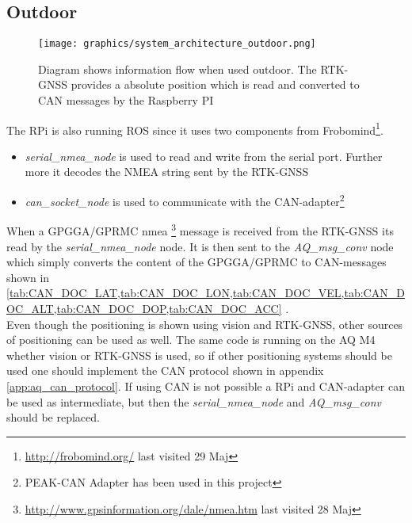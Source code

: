 \subsection{Outdoor}
\begin{figure}[H]
    \center
    \texttt{[image: graphics/system\_architecture\_outdoor.png]}
    \caption{Diagram shows information flow when used outdoor. The RTK-GNSS provides a absolute position which is read and converted to CAN messages by the Raspberry PI}
    \label{fig:outdoor_information_flow}
\end{figure}

The \ac{RPi} is also running \ac{ROS} since it uses two components from Frobomind\footnote{\url {http://frobomind.org/} last visited 29 Maj}. \begin{itemize}
	\item \textit{serial\_nmea\_node} is used to read and write from the serial port. Further more it decodes the NMEA string sent by the \ac{RTK-GNSS}
	\item \textit{can\_socket\_node} is used to communicate with the \ac{CAN}-adapter\footnote{PEAK-CAN Adapter has been used in this project}
\end{itemize}

When a GPGGA/GPRMC nmea \footnote{\url{http://www.gpsinformation.org/dale/nmea.htm} last visited 28 Maj} message is received from the \ac{RTK-GNSS} its read by the \textit{serial\_nmea\_node} node. It is then sent to the \textit{AQ\_msg\_conv} node which simply converts the content of the GPGGA/GPRMC to CAN-messages shown in \cref{tab:CAN_DOC_LAT,tab:CAN_DOC_LON,tab:CAN_DOC_VEL,tab:CAN_DOC_ALT,tab:CAN_DOC_DOP,tab:CAN_DOC_ACC}  . \\

Even though the positioning is shown using vision and \ac{RTK-GNSS}, other sources of positioning can be used as well. The same code is running on the \ac{AQ} M4 whether vision or \ac{RTK-GNSS} is used, so if other positioning systems should be used one should implement the \ac{CAN} protocol shown in appendix \ref{app:aq_can_protocol}.
If using \ac{CAN} is not possible a \ac{RPi} and \ac{CAN}-adapter can be used as intermediate, but then the \textit{serial\_nmea\_node} and \textit{AQ\_msg\_conv} should be replaced.
